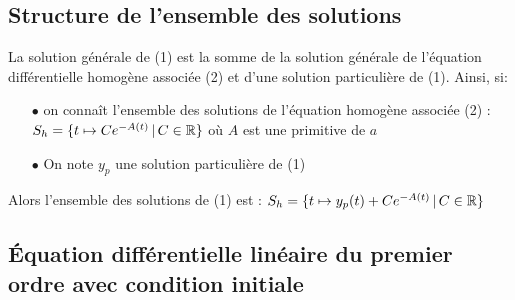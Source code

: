 \documentclass[a4paper, 11pt]{article}
\begin{document}
\subsection{Structure de l'ensemble des solutions}

 {\noindent  

\begin{theorem} 
La solution g\'en\'erale de (1) est la somme de la solution g\'en\'erale de l'\'equation diff\'erentielle homog\`ene associ\'ee (2) et d'une solution particuli\`ere de (1). Ainsi, si: 
\begin{itemize}
\item[$\bullet$] on conna\^{i}t l'ensemble des solutions de l'\'equation homog\`ene associ\'ee (2) : $S_h=\{ t\mapsto C e^{-A(t)}\, |\, C\in \mathbb{R}\}$ où
$A$ est une primitive de $a$
\item[$\bullet$] On note $y_p$ une solution particuli\`ere de (1) 
\end{itemize}
\vsec
Alors l'ensemble des solutions de (1) est : $S_h=\{ t\mapsto y_p(t) + C e^{-A(t)}\, |\, C\in \mathbb{R}\}$
\end{theorem}
 
}
\vsec\vsec

\setlength\fboxrule{1pt}
\setlength\fboxrule{0.5pt}


\vspace*{0.5cm}

\subsection{\'Equation diff\'erentielle lin\'eaire du premier ordre avec condition initiale}

\vsec
\end{document}
